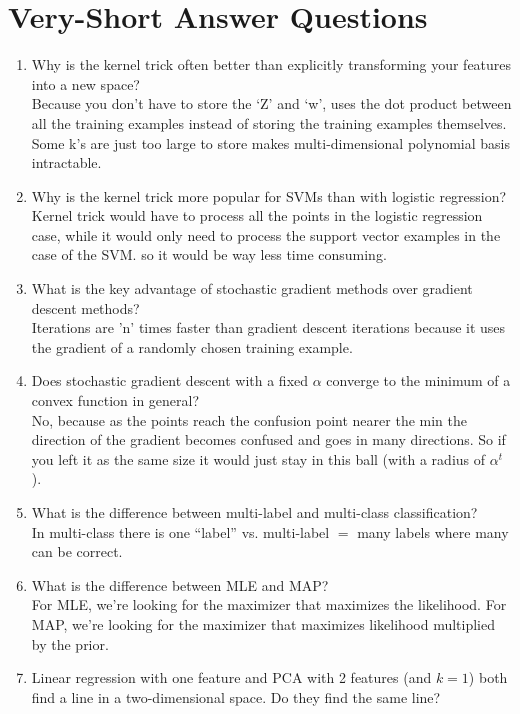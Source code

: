 \documentclass{article}
\def\gre#1{{\color{gre}#1}}
\def\enum#1{\begin{enumerate}#1\end{enumerate}}
\begin{document}
\section{Very-Short Answer Questions}

\enum{
\item Why is the kernel trick often better than explicitly transforming your features into a new space?
\\
\gre{
Because you don’t have to store the ‘Z’ and ‘w’, uses the dot product between all the training examples instead of storing the training examples themselves. Some k’s are just too large to store \- makes multi-dimensional polynomial basis intractable.
}
\item Why is the kernel trick more popular for SVMs than with logistic regression?
\\
\gre{
Kernel trick would have to process all the points in the logistic regression case, while it would only need to process the support vector examples in the case of the SVM. \- so it would be way less time consuming.
}
\item What is the key advantage of stochastic gradient methods over gradient descent methods?
\\
\gre{
Iterations are ’n’ times faster than gradient descent iterations \- because it uses the gradient of a randomly chosen training example.
}
\item Does stochastic gradient descent with a fixed $\alpha$ converge to the minimum of a convex function in general?
\\
\gre{
No, because as the points reach the confusion point \- nearer the min \- the direction of the gradient becomes confused and goes in many directions. So if you left it as the same size it would just stay in this ball (with a radius of $\alpha^t$).
}
\item What is the difference between multi-label and multi-class classification?
\\
\gre{
In multi-class there is one “label” vs. multi-label $=$ many labels where many can be correct.
}
\item What is the difference between MLE and MAP?
\\
\gre{
For MLE, we're looking for the maximizer that maximizes the likelihood.
For MAP, we're looking for the maximizer that maximizes likelihood multiplied by the prior.
}
\item Linear regression with one feature and PCA with 2 features (and $k=1$) both find a line in a two-dimensional space. Do they find the same line?
}
\end{document}
